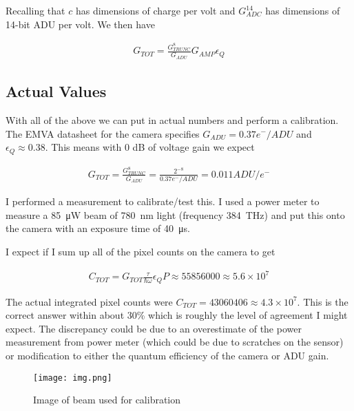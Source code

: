 \documentclass[12pt]{article}
\newcommand{\ep}{\epsilon}
\begin{document}
Recalling that $c$ has dimensions of charge per volt and $G_{ADC}^{14}$ has dimensions of 14-bit ADU per volt.
We then have

\begin{align}
G_{TOT} = \frac{G_{TRUNC}^8}{G_{ADU}} G_{AMP} \ep_Q
\end{align}

\subsection{Actual Values}

With all of the above we can put in actual numbers and perform a calibration.
The EMVA datasheet for the camera specifies $G_{ADU} = 0.37 e^-/ADU$ and $\ep_Q \approx 0.38$.
This means with 0 dB of voltage gain we expect

\begin{align}
G_{TOT} = \frac{G_{TRUNC}^8}{G_{ADU}} = \frac{2^{-8}}{0.37 e^-/ADU} = 0.011 ADU/e^-
\end{align}

I performed a measurement to calibrate/test this.
I used a power meter to measure a \SI{85}{\micro \watt} beam of \SI{780}{\nm} light (frequency \SI{384}{\THz}) and put this onto the camera with an exposure time of \SI{40}{\micro \second}.

I expect if I sum up all of the pixel counts on the camera to get

\begin{align}
C_{TOT} = G_{TOT} \frac{\tau}{\hbar \omega} \ep_Q P \approx 55856000 \approx 5.6 \times 10^7
\end{align}

The actual integrated pixel counts were $C_{TOT} = 43060406 \approx 4.3\times 10^7$. 
This is the correct answer within about 30\% which is roughly the level of agreement I might expect.
The discrepancy could be due to an overestimate of the power measurement from power meter (which could be due to scratches on the sensor) or modification to either the quantum efficiency of the camera or ADU gain. 

\begin{figure}
\centering
\texttt{[image: img.png]}
\caption{Image of beam used for calibration}
\end{figure}
\end{document}
